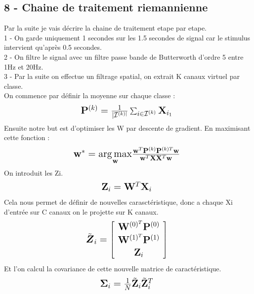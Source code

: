 \documentclass{article}[12pt]
\begin{document}
\subsection{8 - Chaine de traitement riemannienne}
Par la suite je vais décrire la chaine de traitement etape par etape.\\
1 - On garde uniquement 1 secondes sur les 1.5 secondes de signal car le stimulus intervient qu’après 0.5 secondes. \\
2 - On filtre le signal avec un filtre passe bande de Butterworth d'ordre 5 entre 1Hz et 20Hz.\\
3 - Par la suite on effectue un filtrage spatial, on extrait K canaux virtuel par classe.\\
On commence par définir la moyenne sur chaque classe :
$$ \mbox{\Large $ 
\mathbf{P}^{(k)}=\frac{1}{ | \mathcal{I}^{(k) |}} \sum_{i \in \mathcal{I}^{(k)}} \mathbf{X}_{i_{1}}
$ } $$
Ensuite notre but est d'optimiser les W par descente de gradient. En maximisant cette fonction :
$$ \mbox{\Large $ 
\mathbf{w}^{*}=\underset{\mathbf{w}}{\arg \max } \frac{\mathbf{w}^{T} \mathbf{P}^{(k)} \mathbf{P}^{(k) T} \mathbf{w}}{\mathbf{w}^{T} \mathbf{X} \mathbf{X}^{T} \mathbf{w}}
$ } $$
On introduit les Zi.
$$ \mbox{\Large $ 
\mathbf{Z}_{i}=\mathbf{W}^{T} \mathbf{X}_{i}
$ } $$
Cela nous permet de définir de nouvelles carasctéristique, donc a chaque Xi d'entrée sur C canaux on le projette sur K canaux.
$$ \mbox{\Large $ 
\tilde{\boldsymbol{Z}}_{i}=\left[ \begin{array}{c}{\mathbf{W}^{(0)^{T}} \mathbf{P}^{(0)}} \\ {\mathbf{W}^{(1)^{T}} \mathbf{P}^{(1)}} \\ {\mathbf{Z}_{i}}\end{array}\right]
$ } $$
Et l'on calcul la covariance de cette nouvelle matrice de caractéristique.
$$ \mbox{\Large $ 
\boldsymbol{\Sigma}_{i}=\frac{1}{N} \tilde{\mathbf{Z}}_{i} \tilde{\mathbf{Z}}_{i}^{T}
$ } $$
\end{document}
